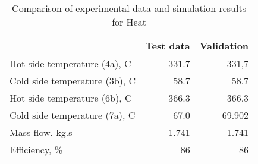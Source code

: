\begin{table}
\label{tab:Comparison}
\caption{Comparison of experimental data and simulation results for Heat }
\begin{center}
\begin{tabulary}{0.9\textwidth}{LRR}
\toprule
& Test data \cite{Iverson_2013}  & Validation \\
\midrule
Hot side temperature (4a), C & 331.7 & 331,7 \\
Cold side temperature (3b), C & 58.7 & 58.7 \\
Hot side temperature (6b), C & 366.3 & 366.3 \\
Cold side temperature (7a), C & 67.0 & 69.902 \\
Mass flow. kg.s & 1.741 & 1.741 \\
Efficiency, \% & 86 & 86 \\
\bottomrule
\end{tabulary}
\end{center}
\end{table}